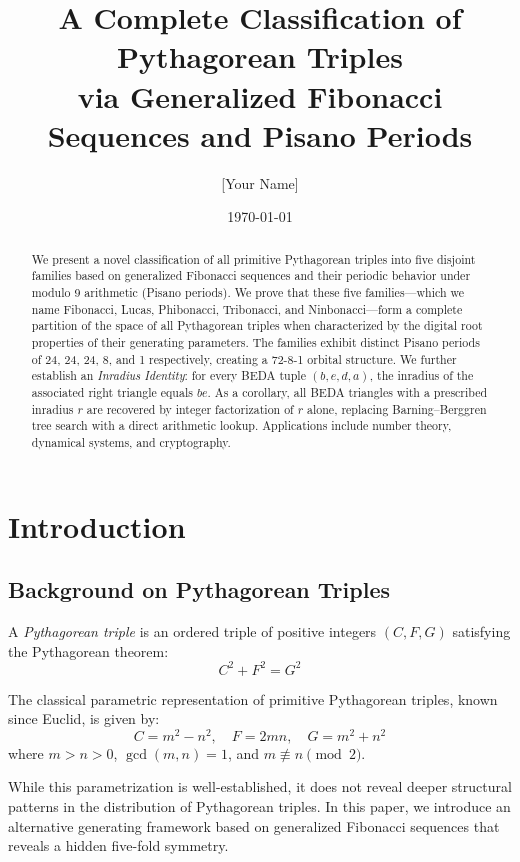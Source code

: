 \documentclass[12pt]{article}
\title{A Complete Classification of Pythagorean Triples\\via Generalized Fibonacci Sequences and Pisano Periods}
\author{[Your Name]\\[Your Affiliation]}
\date{\today}
\begin{document}
\maketitle

\begin{abstract}
We present a novel classification of all primitive Pythagorean triples into five disjoint families based on generalized Fibonacci sequences and their periodic behavior under modulo 9 arithmetic (Pisano periods). We prove that these five families---which we name Fibonacci, Lucas, Phibonacci, Tribonacci, and Ninbonacci---form a complete partition of the space of all Pythagorean triples when characterized by the digital root properties of their generating parameters. The families exhibit distinct Pisano periods of 24, 24, 24, 8, and 1 respectively, creating a 72-8-1 orbital structure. We further establish an \emph{Inradius Identity}: for every BEDA tuple $(b,e,d,a)$, the inradius of the associated right triangle equals $be$. As a corollary, all BEDA triangles with a prescribed inradius $r$ are recovered by integer factorization of $r$ alone, replacing Barning--Berggren tree search with a direct arithmetic lookup. Applications include number theory, dynamical systems, and cryptography.
\end{abstract}

\section{Introduction}

\subsection{Background on Pythagorean Triples}

A \emph{Pythagorean triple} is an ordered triple of positive integers $(C, F, G)$ satisfying the Pythagorean theorem:
\begin{equation}
C^2 + F^2 = G^2
\end{equation}

The classical parametric representation of primitive Pythagorean triples, known since Euclid, is given by:
\begin{equation}
C = m^2 - n^2, \quad F = 2mn, \quad G = m^2 + n^2
\end{equation}
where $m > n > 0$, $\gcd(m,n) = 1$, and $m \not\equiv n \pmod{2}$.

While this parametrization is well-established, it does not reveal deeper structural patterns in the distribution of Pythagorean triples. In this paper, we introduce an alternative generating framework based on generalized Fibonacci sequences that reveals a hidden five-fold symmetry.
\end{document}
